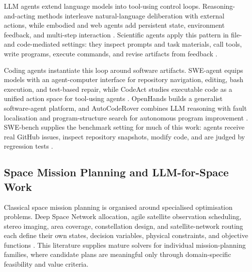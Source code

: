 \documentclass[11pt]{article}
\begin{document}
LLM agents extend language models into tool-using control loops. Reasoning-and-acting methods interleave natural-language deliberation with external actions, while embodied and web agents add persistent state, environment feedback, and multi-step interaction \citep{yao2022react,wangvoyager,zhouwebarena}. Scientific agents apply this pattern in file- and code-mediated settings: they inspect prompts and task materials, call tools, write programs, execute commands, and revise artifacts from feedback \citep{scicode_2024,scienceagentbench_2025}.

Coding agents instantiate this loop around software artifacts. SWE-agent equips models with an agent-computer interface for repository navigation, editing, bash execution, and test-based repair, while CodeAct studies executable code as a unified action space for tool-using agents \citep{yang2024sweagent,wang2024codeact}. OpenHands builds a generalist software-agent platform, and AutoCodeRover combines LLM reasoning with fault localisation and program-structure search for autonomous program improvement \citep{wang2024openhands,zhang2024autocoderover}. SWE-bench supplies the benchmark setting for much of this work: agents receive real GitHub issues, inspect repository snapshots, modify code, and are judged by regression tests \citep{jimenezswe}.

\subsection{Space Mission Planning and LLM-for-Space Work}

Classical space mission planning is organised around specialised optimisation problems. Deep Space Network allocation, agile satellite observation scheduling, stereo imaging, area coverage, constellation design, and satellite-network routing each define their own states, decision variables, physical constraints, and objective functions \citep{johnston2006automating,goh2021satnet,lemaitrea2002selecting,he2018improved,zezhong2023multiple,lee2024satellite,lyu2024dynamic}. This literature supplies mature solvers for individual mission-planning families, where candidate plans are meaningful only through domain-specific feasibility and value criteria.
\end{document}
